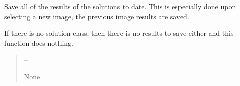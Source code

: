 \documentclass[letterpaper,11pt,english]{sphinxmanual}
\begin{document}
\begin{savenotes}
\begin{fulllineitems}

\begin{savenotes}\begin{fulllineitems}
\label{\detokenize{code/opihiexarata.gui.manual:opihiexarata.gui.manual.OpihiManualWindow.save_results}}
\pysigstartsignatures
{}
\pysigstopsignatures
\sphinxAtStartPar
Save all of the results of the solutions to date. This is especially
done upon selecting a new image, the previous image results are
saved.

\sphinxAtStartPar
If there is no solution class, then there is no results to save either
and this function does nothing.
\begin{quote}\begin{description}
\sphinxAtStartPar
{} – 

\sphinxAtStartPar
None

\end{description}\end{quote}

\end{fulllineitems}\end{savenotes}


\begin{savenotes}\begin{fulllineitems}
\label{\detokenize{code/opihiexarata.gui.manual:opihiexarata.gui.manual.OpihiManualWindow.staticMetaObject}}
\pysigstartsignatures
{}
\pysigstopsignatures
\end{fulllineitems}\end{savenotes}


\end{fulllineitems}\end{savenotes}

\end{document}
